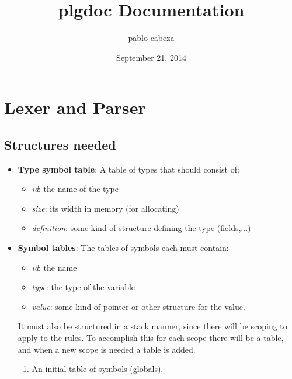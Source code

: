 \documentclass[letterpaper,10pt,english]{sphinxmanual}
\title{plgdoc Documentation}
\date{September 21, 2014}
\author{pablo cabeza}
\begin{document}
\maketitle
\tableofcontents
{}\label{index::doc}



\chapter{Lexer and Parser}
\label{documentation:lexer-and-parser}\label{documentation::doc}\label{documentation:documentacion-practica-plg}

\section{Structures needed}
\label{documentation:structures-needed}\begin{itemize}
\item {} 
\textbf{Type symbol table}: A table of types that should consist of:
\begin{itemize}
\item {} 
\emph{id}: the name of the type

\item {} 
\emph{size}: its width in memory (for allocating)

\item {} 
\emph{definition}: some kind of structure defining the type (fields,...)

\end{itemize}

\item {} 
\textbf{Symbol tables}: The tables of symbols each must contain:
\begin{itemize}
\item {} 
\emph{id}: the name

\item {} 
\emph{type}: the type of the variable

\item {} 
\emph{value}: some kind of pointer or other structure for the value.

\end{itemize}

It must  also be structured in  a stack manner, since  there will be
scoping to  apply to  the rules. To  accomplish this for  each scope
there will  be a table, and  when a new  scope is needed a  table is
added.
\begin{enumerate}
\item {} 
An initial table of symbols (globals).


\end{enumerate}
\end{itemize}
\end{document}
